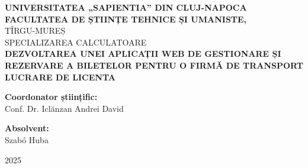\begin{titlepage}
    \centering
    \vspace*{2cm}

    {\Large \textbf{UNIVERSITATEA „SAPIENTIA” DIN CLUJ-NAPOCA}}\\[0.2cm]
    {\Large \textbf{FACULTATEA DE ȘTIINȚE TEHNICE ȘI UMANISTE,}}\\[0.5cm]
    {\large TÎRGU-MUREȘ}\\[0.2cm]
    {\large  SPECIALIZAREA CALCULATOARE}\\[3cm]

    {\LARGE \textbf{DEZVOLTAREA UNEI APLICAȚII WEB DE GESTIONARE ȘI REZERVARE A BILETELOR PENTRU O FIRMĂ DE TRANSPORT}}\\[0.5cm] 
    {\Large \textbf{LUCRARE DE  LICENTA}}\\[4cm]

    \noindent
\begin{minipage}[t]{0.48\textwidth}
    \raggedright
    \textbf{Coordonator științific:}\\[1em]
    Conf. Dr. Iclănzan Andrei David
\end{minipage}
\hfill
\begin{minipage}[t]{0.48\textwidth}
    \raggedleft
    \textbf{Absolvent:}\\[1em]
    Szabó Huba
\end{minipage}


    \vfill

    {\large  2025}

\end{titlepage}
